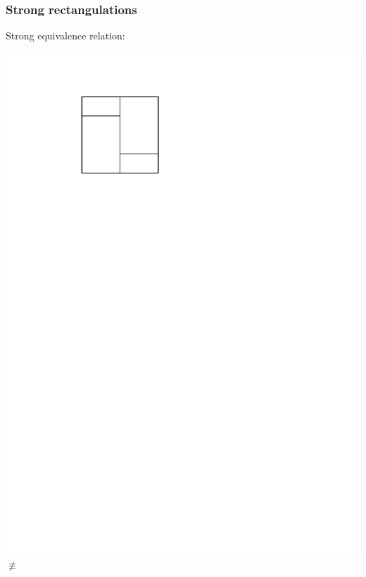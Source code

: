 \documentclass[11pt]{beamer}%
\begin{document}
\begin{frame}
  \frametitle{Strong rectangulations}
  Strong equivalence relation:
    \begin{center}
      \includegraphics[page=1,height=.1\textheight]{figures.pdf} $\not\equiv$ 

\end{center}
\end{frame}
\end{document}
